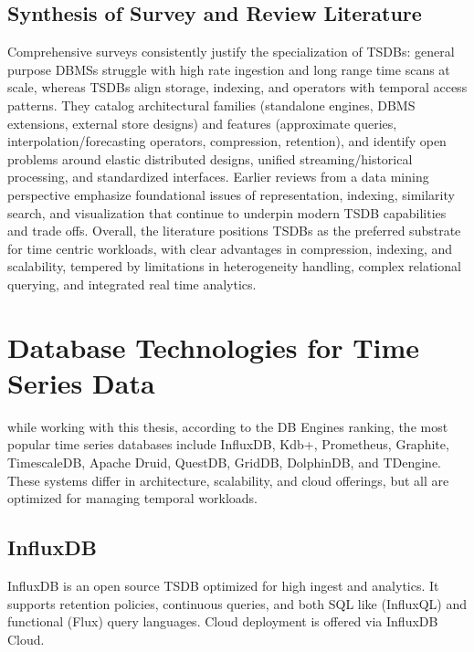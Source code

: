 \subsection{Synthesis of Survey and Review Literature} Comprehensive surveys
consistently justify the specialization of TSDBs: general purpose DBMSs
struggle with high rate ingestion and long range time scans at scale, whereas
TSDBs align storage, indexing, and operators with temporal access
patterns\cite{Jensen2017,Jensen2022}. They catalog architectural families
(standalone engines, DBMS extensions, external store designs) and features
(approximate queries, interpolation/forecasting operators, compression,
retention), and identify open problems around elastic distributed designs,
unified streaming/historical processing, and standardized
interfaces\cite{Jensen2022}. Earlier reviews from a data mining perspective
emphasize foundational issues of representation, indexing, similarity search,
and visualization that continue to underpin modern TSDB capabilities and
trade offs\cite{Garima2014}. Overall, the literature positions TSDBs as the
preferred substrate for time centric workloads, with clear advantages in
compression, indexing, and scalability, tempered by limitations in
heterogeneity handling, complex relational querying, and integrated real time
analytics\cite{Jensen2017,Jensen2022,Chiarot2023}.

\section{Database Technologies for Time Series
  Data}\label{sec:database-technologies-time-series}

while working with this thesis, according to the DB Engines
ranking\cite{dbengines2025}, the most popular time series databases include
InfluxDB, Kdb+, Prometheus, Graphite, TimescaleDB, Apache Druid, QuestDB,
GridDB, DolphinDB, and TDengine. These systems differ in architecture,
scalability, and cloud offerings, but all are optimized for managing temporal
workloads.

\subsection{InfluxDB} InfluxDB is an open source TSDB optimized for high ingest
and analytics. It supports retention policies, continuous queries, and both
SQL like (InfluxQL) and functional (Flux) query languages. Cloud deployment is
offered via InfluxDB Cloud\cite{influxdbDocs}.

